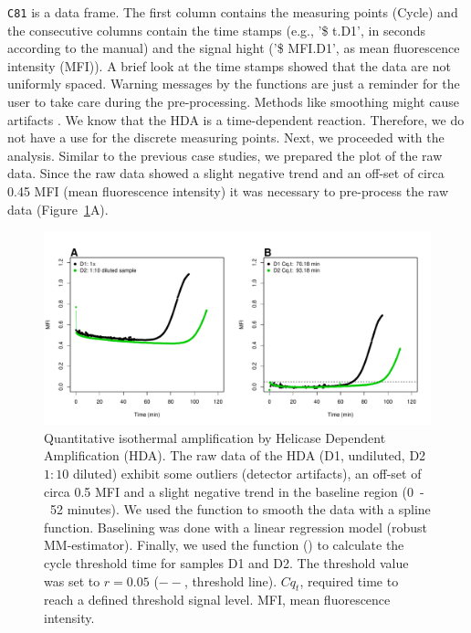 
\texttt{C81} is a data frame. The first column contains the measuring points 
(Cycle) and the consecutive columns contain the time stamps (e.g., '\$ t.D1', 
in seconds according to the  manual) and the signal hight ('\$ 
MFI.D1', as mean fluorescence intensity (MFI)). A brief look at the time stamps 
showed that the data are not uniformly spaced. Warning messages by the 
 functions are just a reminder for the user to take care during the pre-processing. 
Methods like smoothing might cause artifacts \citep{Spiess_2014}. We know 
that the HDA is a time-dependent reaction. Therefore, we do not have a use for the discrete 
measuring points. Next, we proceeded with the analysis. Similar to the previous 
case studies, we prepared the plot of the raw data. Since the raw data showed a 
slight negative trend and an off-set of circa 0.45 MFI (mean fluorescence 
intensity) it was necessary to pre-process the raw data 
(Figure~\ref{figure:qIA}A).

\begin{figure}[htbp]
  \centering
  \includegraphics[clip=true, trim=0.15cm 0.55cm 1cm 1.3cm, width=12cm]{figures/qIA.pdf}
  \caption{Quantitative isothermal amplification by Helicase Dependent 
Amplification (HDA).  The raw data of the HDA (D1, undiluted, D2 
$1:10$ diluted) exhibit some outliers (detector artifacts), an off-set of circa 
0.5 MFI and a slight negative trend in the 
baseline region (0~-~52 minutes).  We used the  
function to smooth the data with a spline function. Baselining was done with a 
linear regression model (robust MM-estimator). Finally, we used the 
 function () to calculate the cycle threshold time 
for samples D1 and D2. The threshold value was set to $r = 0.05$ ($--$, 
threshold line). $Cq_{t}$, required time to reach a defined threshold signal 
level. MFI, mean fluorescence intensity.}
  \label{figure:qIA}
\end{figure}

